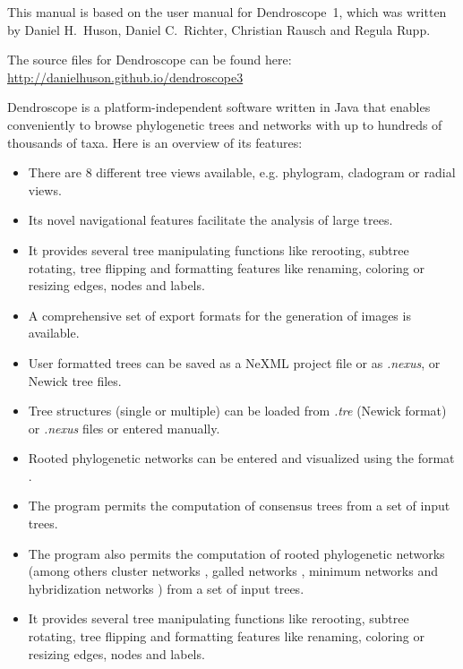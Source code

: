 \documentclass[11pt]{article}
\def\Dendroscope{{\sf Dendroscope }}
\begin{document}
This manual is based on the user manual for Dendroscope~1, which was written by
Daniel H.~Huson, Daniel C.~Richter, Christian Rausch and Regula Rupp.

The source files for \Dendroscope can be found here: \url{http://danielhuson.github.io/dendroscope3}

\Dendroscope is a platform-independent software written in Java that enables conveniently to 
browse phylogenetic trees  and networks with up to hundreds of thousands of taxa.
Here is an overview of its features:
\begin{itemize}
\item There are 8 different tree views available, e.g. phylogram, cladogram or radial views.
\item Its novel navigational features facilitate the analysis of large trees.
\item It provides several tree manipulating functions like 
rerooting, subtree rotating, tree flipping and formatting features like renaming,
coloring or resizing edges, nodes and labels. 
\item A comprehensive set of export formats for the generation of images is available.
\item User formatted trees can be saved as a NeXML project file or as \textit{.nexus}, or Newick tree files. 
\item Tree structures (single or multiple) can be loaded from  \textit{.tre} (Newick format) or \textit{.nexus} files or entered manually.
\item Rooted phylogenetic networks can be entered and visualized using the  format \cite{Cardona2008}.
\item 
The program permits the computation of consensus trees  from a set of input trees.
\item The program also permits  the computation of rooted phylogenetic networks (among others cluster networks \cite{ClusterNetworks2008}, {galled networks} \cite{GalledNetworks2009}, {minimum networks} \cite{LevelKClusters2010} and hybridization networks  \cite{Albrecht2012,HusonLinz2012}) from a set of input trees.
\item It provides several tree manipulating functions like 
rerooting, subtree rotating, tree flipping and formatting features like renaming,
coloring or resizing edges, nodes and labels. 


\end{itemize}
\end{document}
